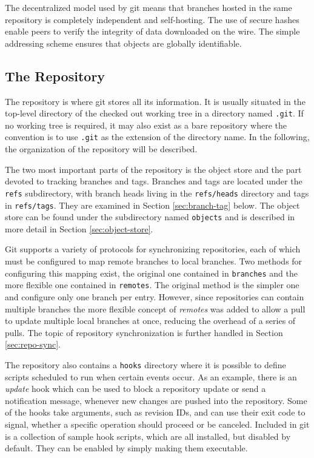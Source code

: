 The decentralized model used by git means that branches hosted in the
same repository is completely independent and self-hosting.  The use
of secure hashes enable peers to verify the integrity of data
downloaded on the wire. The simple addressing scheme ensures that
objects are globally identifiable.
 
\subsection{The Repository}

The repository is where git stores all its information. It is usually
situated in the top-level directory of the checked out working tree in
a directory named \texttt{.git}. If no working tree is required, it
may also exist as a bare repository where the convention is to use
\texttt{.git} as the extension of the directory name. In the
following, the organization of the repository will be described.


The two most important parts of the repository is the object store and
the part devoted to tracking branches and tags. Branches and tags are
located under the \texttt{refs} subdirectory, with branch heads living
in the \texttt{refs/heads} directory and tags in \texttt{refs/tags}.
They are examined in Section \ref{sec:branch-tag} below. The object
store can be found under the subdirectory named \texttt{objects} and
is described in more detail in Section \ref{sec:object-store}.

Git supports a variety of protocols for synchronizing repositories,
each of which must be configured to map remote branches to local
branches. Two methods for configuring this mapping exist, the original
one contained in \texttt{branches} and the more flexible one contained
in \texttt{remotes}. The original method is the simpler one and
configure only one branch per entry. However, since repositories can
contain multiple branches the more flexible concept of \emph{remotes}
was added to allow a pull to update multiple local branches at once,
reducing the overhead of a series of pulls. The topic of repository
synchronization is further handled in Section \ref{sec:repo-sync}.

The repository also contains a \texttt{hooks} directory where it is
possible to define scripts scheduled to run when certain events occur.
As an example, there is an \emph{update} hook which can be used to
block a repository update or send a notification message, whenever new
changes are pushed into the repository. Some of the hooks take
arguments, such as revision IDs, and can use their exit code to
signal, whether a specific operation should proceed or be canceled.
Included in git is a collection of sample hook scripts, which are all
installed, but disabled by default. They can be enabled by simply
making them executable.

